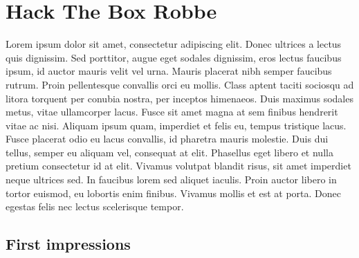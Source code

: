 \documentclass[../main.tex]{subfiles}
\begin{document}
\section{Hack The Box Robbe}

Lorem ipsum dolor sit amet, consectetur adipiscing elit. Donec ultrices a lectus quis dignissim. Sed porttitor, augue eget sodales dignissim, eros lectus faucibus ipsum, id auctor mauris velit vel urna. Mauris placerat nibh semper faucibus rutrum. Proin pellentesque convallis orci eu mollis. Class aptent taciti sociosqu ad litora torquent per conubia nostra, per inceptos himenaeos. Duis maximus sodales metus, vitae ullamcorper lacus. Fusce sit amet magna at sem finibus hendrerit vitae ac nisi. Aliquam ipsum quam, imperdiet et felis eu, tempus tristique lacus. Fusce placerat odio eu lacus convallis, id pharetra mauris molestie. Duis dui tellus, semper eu aliquam vel, consequat at elit. Phasellus eget libero et nulla pretium consectetur id at elit. Vivamus volutpat blandit risus, sit amet imperdiet neque ultrices sed. In faucibus lorem sed aliquet iaculis. Proin auctor libero in tortor euismod, eu lobortis enim finibus. Vivamus mollis et est at porta. Donec egestas felis nec lectus scelerisque tempor.

\subsection{First impressions}
\end{document}
